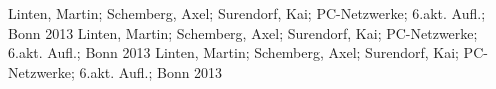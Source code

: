 
 Linten, Martin; Schemberg, Axel; Surendorf, Kai; PC-Netzwerke; 6.akt. Aufl.; Bonn 2013
 Linten, Martin; Schemberg, Axel; Surendorf, Kai; PC-Netzwerke; 6.akt. Aufl.; Bonn 2013
 Linten, Martin; Schemberg, Axel; Surendorf, Kai; PC-Netzwerke; 6.akt. Aufl.; Bonn 2013